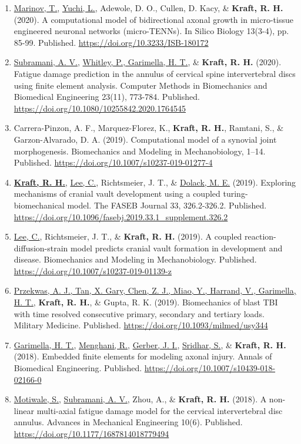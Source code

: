 \documentclass[a4paper,10pt]{article}
\begin{document}
\begin{enumerate}
\item \underline{Marinov, T.}, \underline{Yuchi, L.}, Adewole, D. O., Cullen, D. Kacy, \& \textbf{\textbf{Kraft,} R. H.} (2020). A computational model of bidirectional axonal growth in micro-tissue engineered neuronal networks (micro-TENNs). In Silico Biology 13(3-4), pp. 85-99. Published. \url{https://doi.org/10.3233/ISB-180172}
\item \underline{Subramani, A. V.}, \underline{Whitley, P., Garimella, H. T.}, \& \textbf{\textbf{Kraft,} R. H.} (2020). Fatigue damage prediction in the annulus of cervical spine intervertebral discs using finite element analysis. Computer Methods in Biomechanics and Biomedical Engineering 23(11), 773-784. Published. \url{https://doi.org/10.1080/10255842.2020.1764545}
\item Carrera-Pinzon, A. F., Marquez-Florez, K., \textbf{\textbf{Kraft,} R. H.}, Ramtani, S., \& Garzon-Alvarado, D. A. (2019). Computational model of a synovial joint morphogenesis. Biomechanics and Modeling in Mechanobiology, 1--14. Published. \url{https://doi.org/10.1007/s10237-019-01277-4}
\item \underline{\textbf{\textbf{Kraft,} R. H.}}, \underline{Lee, C.}, Richtsmeier, J. T., \& \underline{Dolack, M. E.} (2019). Exploring mechanisms of cranial vault development using a coupled turing-biomechanical model. The FASEB Journal 33, 326.2-326.2. Published. \url{https://doi.org/10.1096/fasebj.2019.33.1_supplement.326.2}
\item \underline{Lee, C.}, Richtsmeier, J. T., \& \textbf{\textbf{Kraft,} R. H.} (2019). A coupled reaction-diffusion-strain model predicts cranial vault formation in development and disease. Biomechanics and Modeling in Mechanobiology. Published. \url{https://doi.org/10.1007/s10237-019-01139-z}
\item \underline{Przekwas, A. J., Tan, X. Gary, Chen, Z. J., Miao, Y., Harrand, V., Garimella, H. T.}, \textbf{\textbf{Kraft,} R. H.}, \& Gupta, R. K. (2019). Biomechanics of blast TBI with time resolved consecutive primary, secondary and tertiary loads. Military Medicine. Published. \url{https://doi.org/10.1093/milmed/usy344}
\item \underline{Garimella, H. T.}, \underline{Menghani, R.}, \underline{Gerber, J. I.}, \underline{Sridhar, S.}, \& \textbf{\textbf{Kraft,} R. H.} (2018). Embedded finite elements for modeling axonal injury. Annals of Biomedical Engineering. Published. \url{https://doi.org/10.1007/s10439-018-02166-0}
\item \underline{Motiwale, S.}, \underline{Subramani, A. V.}, Zhou, A., \& \textbf{\textbf{Kraft,} R. H.} (2018). A non-linear multi-axial fatigue damage model for the cervical intervertebral disc annulus. Advances in Mechanical Engineering 10(6). Published. \url{https://doi.org/10.1177/1687814018779494}

\end{enumerate}
\end{document}
